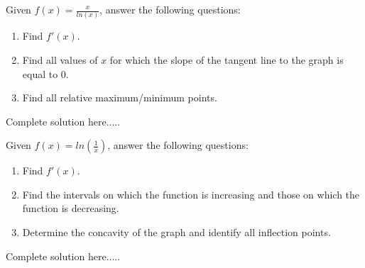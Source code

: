 \begin{example}
Given $f(x)=\displaystyle\frac{x}{ln(x)}$, answer the following questions:
\renewcommand{\labelenumi}{\textbf{(\alph{enumi})}}
\begin{enumerate}[leftmargin=*]
\item Find $f'(x)$.
\item Find all values of $x$ for which the slope of the tangent line to the graph is equal to 0.
\item Find all relative maximum/minimum points. 
\end{enumerate}
    \begin{sol}
    \end{sol}
    \begin{solL}
    Complete solution here.....
    
    \end{solL}
    
\end{example}
\newpage
\begin{example}
Given $f(x)=ln\left(\displaystyle\frac{1}{x}\right)$, answer the following questions:
\renewcommand{\labelenumi}{\textbf{(\alph{enumi})}}
\begin{enumerate}[leftmargin=*]
    \item Find $f'(x)$.
    \item Find the intervals on which the function is increasing and those on which the function is decreasing.
    \item Determine the concavity of the graph and identify all inflection points.
\end{enumerate}
    \begin{sol}
    \end{sol}
    \begin{solL}
    Complete solution here.....
    
    \end{solL}
    
\end{example}
